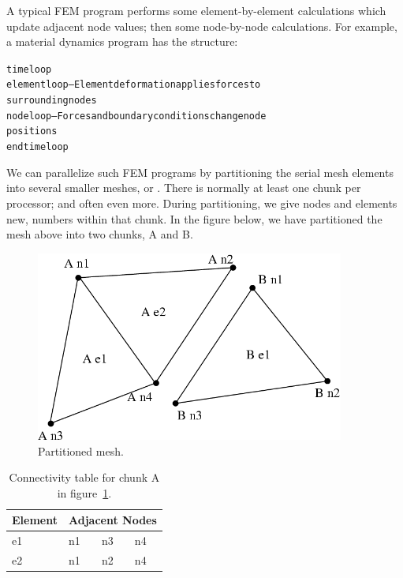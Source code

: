 \documentclass[10pt]{article}
\begin{document}
A typical FEM program performs some element-by-element calculations which
update adjacent node values; then some node-by-node calculations.  For
example, a material dynamics program has the structure:

\begin{alltt}
     time loop
          element loop-- Element deformation applies forces to
          surrounding nodes
          node loop-- Forces and boundary conditions change node
          positions
     end time loop
\end{alltt}

We can parallelize such FEM programs by partitioning the serial mesh
elements into several smaller meshes, or .  There is normally
at least one chunk per processor; and often even more.  During partitioning, 
we give nodes and elements new,  numbers within that chunk.
In the figure below, we have partitioned the mesh above into two chunks, A and B.

\begin{figure}[h]
\begin{center}
\includegraphics[width=4in]{fig/partitioned_mesh}
\end{center}
\caption{Partitioned mesh.}
\label{fig:partitionedmesh}
\end{figure}

\begin{table}[hh]
\begin{center}
\begin{tabular}{||l||l|l|l||}\hline
Element & \multicolumn{3}{c||}{Adjacent Nodes} \\\hline
e1 & n1 & n3 & n4 \\
e2 & n1 & n2 & n4 \\
\hline
\end{tabular}
\end{center}
\caption{Connectivity table for chunk A in figure~\ref{fig:partitionedmesh}.}
\label{table:chunkA}
\end{table}
\end{document}
